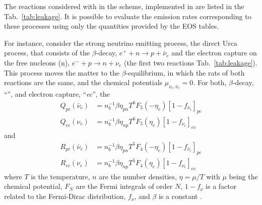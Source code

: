 %
The reactions considered with in the scheme, implemented in \wisky{} are listed in the 
Tab.~\ref{tab:leakage}.
%
It is possible to evaluate the emission rates corresponding to these processes 
using only the quantities provided by the \ac{EOS} tables.

For instance, consider the strong neutrino emitting process, the direct Urca process, 
that consists of the $\beta$-decay, $e^+ + n \rightarrow p + \bar{\nu}_e$ 
and the electron capture on the free nucleons (n), $e^{-} + p \rightarrow n + \nu_e$ 
(the first two reactions Tab.~\ref{tab:leakage}). 
This process moves the matter to the $\beta$-equilibrium, in which the rats 
of both reactions are the same, and the chemical potentials $\mu_{\nu_e,\bar{\nu}_e}=0$.
%
For both, $\beta$-decay, ``'', and electron capture, ``\textit{ec}'', the 
\begin{equation}
\begin{aligned}
    Q_{pc}(\bar{\nu}_e) &= n_b^{-1}\beta\eta_{pn}T^6F_5(-\eta_e)[1-f_{\bar{\nu}_e}]_{pc} \\
    Q_{ec}(\nu_e) &= n_b^{-1}\beta\eta_{np}T^6F_{5}(\eta_e)[1-f_{\nu_e}]_{ec}
\end{aligned}
\label{eq:theory:qecpc}
\end{equation}
and
\begin{equation}
\begin{aligned}
    R_{pc}(\bar{\nu}_e) &= n_b^{-1}\beta\eta_{pn}T^5F_4(-\eta_e)[1-f_{\bar{\nu}_e}]_{pc} \\
    R_{ec}(\nu_e) &= n_b^{-1}\beta\eta_{np}T^5F_{4}(\eta_e)[1-f_{\nu_e}]_{ec}
\end{aligned}
\label{eq:theory:recpc}
\end{equation}
where $T$ is the temperature, $n$ are the number densities, $\eta=\mu/T$ with $\mu$ being the 
chemical potential, $F_N$ are the Fermi integrals of order $N$,
$1-f_{\nu}$ is a factor related to the Fermi-Dirac distribution, $f_{\nu}$, and $\beta$
is a constant \citep{Bruenn:1985}.
